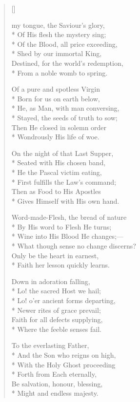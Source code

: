\newHymn
{}
\label{hymn:DownInAdoration}

\begin{verse}[\versewidth]

 my tongue, the Saviour's glory, \\*
Of His flesh the mystery sing;\\*
Of the Blood, all price exceeding,\\* 
Shed by our immortal King,\\
Destined, for the world's redemption,  \\*
From a noble womb to spring.   
\pointorig

Of a pure and spotless Virgin\\*
Born for us on earth below,\\*
He, as Man, with man conversing,\\*
Stayed, the seeds of truth to sow;   \\
Then He closed in solemn order \\*
Wondrously His life of woe.

On the night of that Last Supper,\\*
Seated with His chosen band,   \\*
He the Pascal victim eating,   \\*
First fulfills the Law's command;  \\
Then as Food to His Apostles   \\*
Gives Himself with His own hand.  

Word-made-Flesh, the bread of nature \\*
By His word to Flesh He turns; \\*
Wine into His Blood He changes;---  \\*
What though sense no change discerns?  \\
Only be the heart in earnest,  \\*
Faith her lesson quickly learns.


Down in adoration falling, \\*
Lo! the sacred Host we hail;   \\*
Lo! o'er ancient forms departing, \\*
Newer rites of grace prevail;  \\
Faith for all defects supplying, \\*
Where the feeble senses fail.   

To the everlasting Father,\\*
And the Son who reigns on high,   \\*   
With the Holy Ghost proceeding\\* 
Forth from Each eternally, \\
Be salvation, honour, blessing, \\*
Might and endless majesty.

\end{verse}

\Hpoet{}{}
